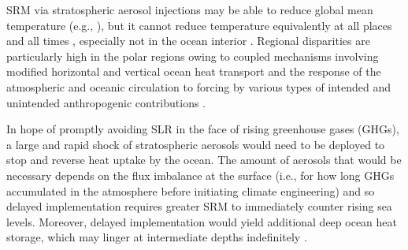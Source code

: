 \documentclass{nature}
\begin{document}
SRM via stratospheric aerosol injections may be able to reduce global mean temperature (e.g., \cite{kravitz13}), but it cannot reduce temperature equivalently at all places and all times \cite{ricke10}, especially not in the ocean interior \cite{mccusker12}. Regional disparities are particularly high in the polar regions owing to coupled mechanisms involving modified horizontal and vertical ocean heat transport \cite{mccusker12} and the response of the atmospheric and oceanic circulation to forcing by various types of intended and unintended anthropogenic contributions \cite{ammann10,mccusker12}. %

In hope of promptly avoiding SLR in the face of rising greenhouse gases (GHGs), a large and rapid shock of stratospheric aerosols would need to be deployed to stop and reverse heat uptake by the ocean. The amount of aerosols that would be necessary depends on the flux imbalance at the surface (i.e., for how long GHGs accumulated in the atmosphere before initiating climate engineering) and so delayed implementation requires greater SRM to immediately counter rising sea levels. Moreover, delayed implementation would yield additional deep ocean heat storage, which may linger at intermediate depths indefinitely \cite{gillett11}. %
\end{document}

